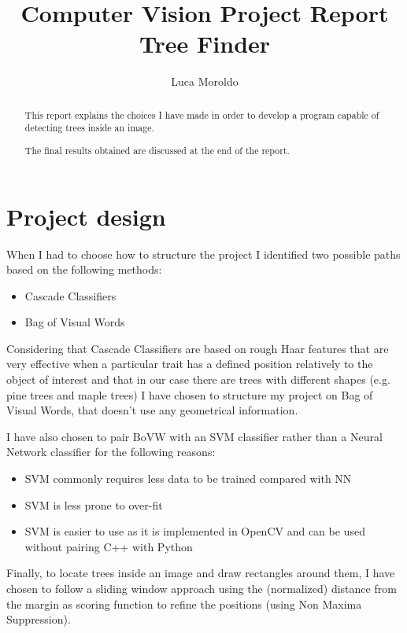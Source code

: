 \documentclass[]{report}
\title{Computer Vision Project Report \\ Tree Finder}
\author{Luca Moroldo}
\begin{document}
\maketitle

\begin{abstract}
	This report explains the choices I have made in order to develop a program capable of detecting trees inside an image.
	
	The final results obtained are discussed at the end of the report.
	 
\end{abstract}

\section{Project design}
When I had to choose how to structure the project I identified two possible paths based on the following methods:

\begin{itemize}
	\item Cascade Classifiers
	\item Bag of Visual Words
\end{itemize}

Considering that Cascade Classifiers are based on rough Haar features that are very effective when a particular trait has a defined position relatively to the object of interest and that in our case there are trees with different shapes (e.g. pine trees and maple trees) I have chosen to structure my project on Bag of Visual Words, that doesn't use any geometrical information.

I have also chosen to pair BoVW with an SVM classifier rather than a Neural Network classifier for the following reasons:

\begin{itemize}
	\item SVM commonly requires less data to be trained compared with NN
	\item SVM is less prone to over-fit
	\item SVM is easier to use as it is implemented in OpenCV and can be used without pairing C++ with Python
\end{itemize}

Finally, to locate trees inside an image and draw rectangles around them, I have chosen to follow a sliding window approach using the (normalized) distance from the margin as scoring function to refine the positions (using Non Maxima Suppression).
\end{document}
